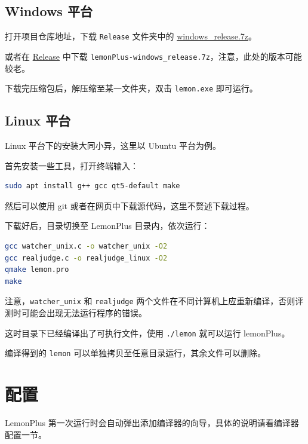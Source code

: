 \documentclass[12pt, a4paper]{article}
\begin{document}
\subsection{Windows 平台}
打开项目仓库地址，下载 \texttt{Release} 文件夹中的 \href{https://raw.githubusercontent.com/Dust1404/Project_LemonPlus/master/Release/windows_release.7z}{windows\_release.7z}。

或者在 \href{https://github.com/Dust1404/Project_LemonPlus/releases}{Release} 中下载 \texttt{lemonPlus-windows\_release.7z}，注意，此处的版本可能较老。

下载完压缩包后，解压缩至某一文件夹，双击 \texttt{lemon.exe} 即可运行。

\subsection{Linux 平台}\label{linux install}
Linux 平台下的安装大同小异，这里以 Ubuntu 平台为例。

首先安装一些工具，打开终端输入：

\begin{lstlisting}[language=bash,frame=shadowbox,basicstyle=\ttfamily]
sudo apt install g++ gcc qt5-default make
\end{lstlisting}

然后可以使用 git 或者在网页中下载源代码，这里不赘述下载过程。

下载好后，目录切换至 LemonPlus 目录内，依次运行：

\begin{lstlisting}[language=bash,frame=shadowbox,basicstyle=\ttfamily]
gcc watcher_unix.c -o watcher_unix -O2
gcc realjudge.c -o realjudge_linux -O2
qmake lemon.pro
make
\end{lstlisting}

注意，\texttt{watcher\_unix} 和 \texttt{realjudge} 两个文件在不同计算机上应重新编译，否则评测时可能会出现无法运行程序的错误。

这时目录下已经编译出了可执行文件，使用 \texttt{./lemon} 就可以运行 lemonPlus。

编译得到的 \texttt{lemon} 可以单独拷贝至任意目录运行，其余文件可以删除。

\newpage

\section{配置}

LemonPlus 第一次运行时会自动弹出添加编译器的向导，具体的说明请看编译器配置一节。
\end{document}
